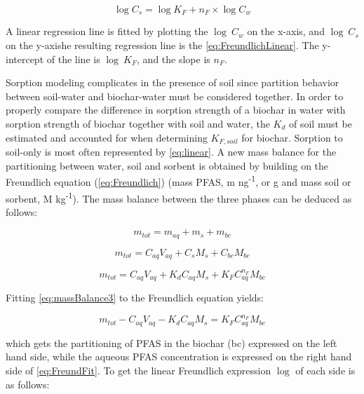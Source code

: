 \begin{equation} \label{eq:FreundlichLinear}
    \log C_s = \log K_F + n_F \times \log C_{w}
\end{equation}

A linear regression line is fitted by plotting the $\log~C_w$ on the x-axis, and $\log~C_s$ on the y-axishe resulting regression line is the \cref{eq:FreundlichLinear}. The y-intercept of the line is $\log~K_F$, and the slope is $n_F$. 

Sorption modeling complicates in the presence of soil since partition behavior between soil-water and biochar-water must be considered together. In order to properly compare the difference in sorption strength of a biochar in water with sorption strength of biochar together with soil and water, the $K_d$ of soil must be estimated and accounted for when determining $K_{F,soil}$ for biochar. Sorption to soil-only is most often represented by \cref{eq:linear}. A new mass balance for the partitioning between water, soil and sorbent is obtained by building on the Freundlich equation (\cref{eq:Freundlich}) (mass PFAS, m ng\textsuperscript{-1}, or \textmu g and mass soil or sorbent, M kg\textsuperscript{-1}). The mass balance between the three phases can be deduced as follows:

\begin{equation} \label{eq:massBalance1}
    m_{tot} = m_{aq} + m_{s} + m_{bc}
\end{equation}

\begin{equation} \label{eq:massBalance2}
     m_{tot} = C_{aq}V_{aq} + C_sM_s + C_{bc}M_{bc}
\end{equation}

\begin{equation} \label{eq:massBalance3}
     m_{tot} = C_{aq}V_{aq} + K_dC_{aq}M_s + K_{F}C_{aq}^{n_F}M_{bc}
\end{equation}
 
Fitting \cref{eq:massBalance3} to the Freundlich equation yields:

\begin{equation} \label{eq:FreundFit}
    m_{tot} - C_{aq}V_{aq} - K_dC_{aq}M_s = K_{F}C_{aq}^{n_F}M_{bc}
\end{equation}

which gets the partitioning of PFAS in the biochar (bc) expressed on the left hand side, while the aqueous PFAS concentration is expressed on the right hand side of \cref{eq:FreundFit}. To get the linear Freundlich expression $\log$ of each side is as follows:

